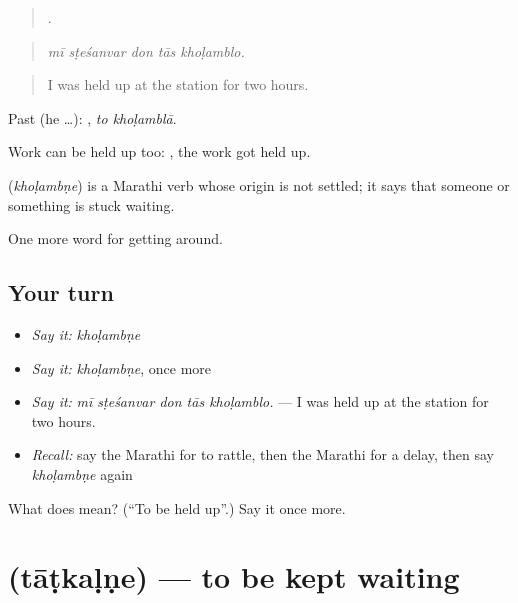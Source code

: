 \begin{quote}
    .
\end{quote}

\begin{quote}
\emph{mī sṭeśanvar don tās khoḷamblo.}
\end{quote}

\begin{quote}
I was held up at the station for two hours.
\end{quote}

Past (he …):  , \emph{to khoḷamblā}.

Work can be held up too:  , the work got held up.

\begin{cousinweb}
\textbf{} (\emph{khoḷambṇe}) is a Marathi verb whose origin is not settled; it says that someone or something is stuck waiting.
\end{cousinweb}

\begin{grammarlens}[title={What you've built}]
One more word for getting around.
\end{grammarlens}

\subsection*{Your turn}
\begin{itemize}
\raggedright
  \item \emph{Say it:} \emph{khoḷambṇe}
  \item \emph{Say it:} \emph{khoḷambṇe}, once more
  \item \emph{Say it:} \emph{mī sṭeśanvar don tās khoḷamblo.} — I was held up at the station for two hours.
  \item \emph{Recall:} say the Marathi for to rattle, then the Marathi for a delay, then say \emph{khoḷambṇe} again
\end{itemize}

\begin{tcolorbox}[breakable,colback=teal!4,colframe=teal!35!black,title={Before you move on}]
What does  mean? (\textquotedblleft{}To be held up\textquotedblright{}.) Say it once more.
\end{tcolorbox}
\section[\texorpdfstring{\mr{ताटकळणे} (tāṭkaḷṇe)}{ताटकळणे (tāṭkaḷṇe)}]{ (tāṭkaḷṇe) — to be kept waiting}

